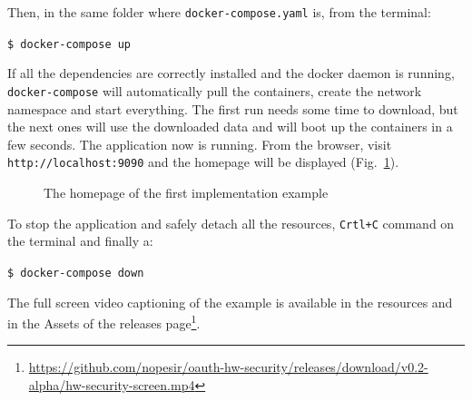 \newpage

\noindent Then, in the same folder where \texttt{docker-compose.yaml} is, from the terminal:

  \texttt{\$ docker-compose up}

\noindent If all the dependencies are correctly installed and the docker daemon is running, \texttt{docker-compose} will automatically pull the containers, create the network namespace and start everything. The first run needs some time to download, but the next ones will use the downloaded data and will boot up the containers in a few seconds. The application now is running. From the browser, visit \texttt{http://localhost:9090} and the homepage will be displayed (Fig.~\ref{fig:home1}).

\begin{figure}[h!]
    \centering
    
    \caption{The homepage of the first implementation example}
    \label{fig:home1}
\end{figure}

\noindent To stop the application and safely detach all the resources, \texttt{Crtl+C} command on the terminal and finally a:

  \texttt{\$ docker-compose down}

\noindent The full screen video captioning of the example is available in the resources and in the Assets of the releases page\footnote{\scriptsize{\url{https://github.com/nopesir/oauth-hw-security/releases/download/v0.2-alpha/hw-security-screen.mp4}}}. 

